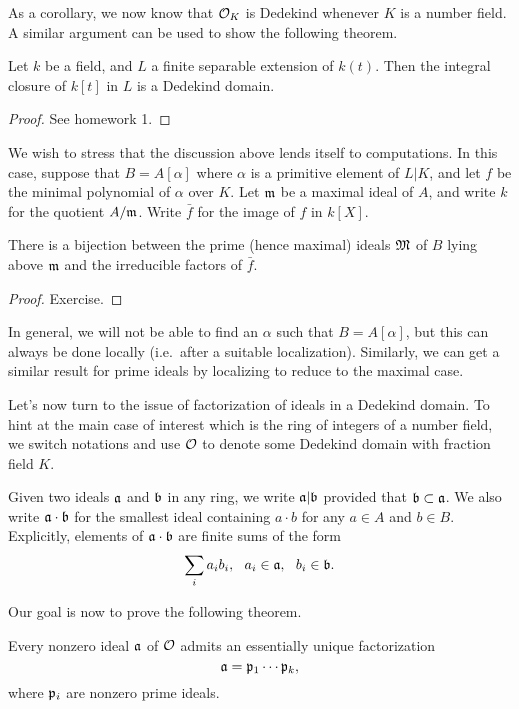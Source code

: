 As a corollary, we now know that $\mathcal{O}_{K}$ is Dedekind whenever $K$ is a number field.
A similar argument can be used to show the following theorem.
\begin{theorem}
  Let $k$ be a field, and $L$ a finite separable extension of $k(t)$.
  Then the integral closure of $k[t]$ in $L$ is a Dedekind domain.
\end{theorem}
\begin{proof}
  See homework 1.
\end{proof}

We wish to stress that the discussion above lends itself to computations.
In this case, suppose that $B = A[\alpha]$ where $\alpha$ is a primitive element of $L|K$, and let $f$ be the minimal polynomial of $\alpha$ over $K$.
Let $\mathfrak{m}$ be a maximal ideal of $A$, and write $k$ for the quotient $A/\mathfrak{m}$.
Write $\bar f$ for the image of $f$ in $k[X]$.

\begin{theorem}
  There is a bijection between the prime (hence maximal) ideals $\mathfrak{M}$ of $B$ lying above $\mathfrak{m}$ and the irreducible factors of $\bar f$.
\end{theorem}
\begin{proof}
  Exercise.
\end{proof}

In general, we will not be able to find an $\alpha$ such that $B = A[\alpha]$, but this can always be done locally (i.e.~after a suitable localization).
Similarly, we can get a similar result for prime ideals by localizing to reduce to the maximal case.

Let's now turn to the issue of factorization of ideals in a Dedekind domain.
To hint at the main case of interest which is the ring of integers of a number field, we switch notations and use $\mathcal{O}$ to denote some Dedekind domain with fraction field $K$.

Given two ideals $\mathfrak{a}$ and $\mathfrak{b}$ in any ring, we write $\mathfrak{a} | \mathfrak{b}$ provided that $\mathfrak{b} \subset \mathfrak{a}$.
We also write $\mathfrak{a} \cdot \mathfrak{b}$ for the smallest ideal containing $a \cdot b$ for any $a \in A$ and $b \in B$.
Explicitly, elements of $\mathfrak{a} \cdot \mathfrak{b}$ are finite sums of the form
\[ \sum_{i} a_{i} b_{i}, \ \ a_{i} \in \afrak, \ \ b_{i} \in \bfrak. \]

Our goal is now to prove the following theorem.
\begin{theorem}\label{theorem:ideal_factorization}
  Every nonzero ideal $\mathfrak{a}$ of $\mathcal{O}$ admits an essentially unique factorization
  \[ \mathfrak{a} = \mathfrak{p}_{1} \cdots \mathfrak{p}_{k}, \]
  where $\mathfrak{p}_{i}$ are nonzero prime ideals.
\end{theorem}

